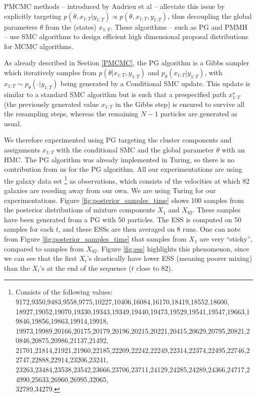 \acrlong{PMCMC} methods -- introduced by Andrieu et al \cite{Andrieu:2010gc} -- alleviate this issue by explicitly targeting $ p(\theta, x_{1:T}|y_{1:T}) \propto p(\theta, x_{1:T},y_{1:T})$, thus decoupling the global parameters $\theta$ from the (states) $x_{1:T}$.
These algorithms -- such as \acrlong{PG} and \acrlong{PMMH} -- use \gls{SMC} algorithms to design efficient high dimensional proposal distributions for \gls{MCMC} algorithms.

As already described in Section \ref{PMCMC}, the \gls{PG} algorithm is a Gibbs sampler which iteratively samples from $p(\theta|x_{1:T},y_{1:T})$ and $p_\theta(x_{1:T}|y_{1:T})$, with $x_{1:T} \sim p_\theta(\cdot|y_{1:T})$ being generated by a Conditional \gls{SMC} update. This update is similar to a standard \gls{SMC} algorithm but is such that a prespecified path $x^\star_{1:T}$ (the previously generated value $x_{1:T}$ in the Gibbs step) is ensured to survive all the resampling steps, whereas the remaining $N-1$ particles are generated as usual.



We therefore experimented using \acrlong{PG} targeting the cluster components and assignments $x_{1:T}$ with the conditional \gls{SMC} and the global parameter $\theta$ with an \gls{HMC}. The \gls{PG} algorithm was already implemented in Turing, so there is no contribution from us for the \gls{PG} algorithm.
All our experimentations are using the galaxy data set 
\footnote{Consists of the following values: 9172,9350,9483,9558,9775,10227,10406,16084,16170,18419,18552,18600,\\18927,19052,19070,19330,19343,19349,19440,19473,19529,19541,19547,19663,19846,19856,19863,19914,19918,\\
19973,19989,20166,20175,20179,20196,20215,20221,20415,20629,20795,20821,20846,20875,20986,21137,21492,\\
21701,21814,21921,21960,22185,22209,22242,22249,22314,22374,22495,22746,22747,22888,22914,23206,23241,\\
23263,23484,23538,23542,23666,23706,23711,24129,24285,24289,24366,24717,24990,25633,26960,26995,32065,\\
32789,34279.} 
as observations, which consists of the velocities at which 82 galaxies are receding away from our own. We are using Turing for our experimentations.
Figure \ref{fig:posterior_samples_time} shows 100 samples from the posterior distributions of mixture components $X_1$ and $X_{82}$. These samples have been generated from a \gls{PG} with 50 particles. The \gls{ESS} is computed on 50 samples for each $t$, and these \glspl{ESS} are then averaged on 8 runs. One can note from Figure \ref{fig:posterior_samples_time} that samples from $X_1$ are very ``sticky'', compared to samples from  $X_{82}$. Figure \ref{fig:ess} highlights this phenomenon, since we can see that the first $X_t$'s drastically have lower \gls{ESS} (meaning poorer mixing) than the $X_t$'s at the end of the sequence ($t$ close to 82). 


